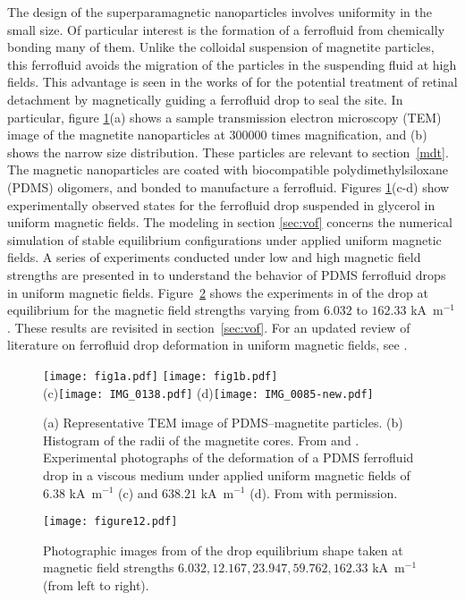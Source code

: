 The design of the superparamagnetic nanoparticles involves uniformity in the small size. Of particular interest is the formation of a ferrofluid from chemically bonding many of them. Unlike the colloidal suspension of magnetite particles, this ferrofluid avoids the  migration of the particles in the suspending fluid at high fields. This advantage is seen in the works of \cite{Mefford,Mefford2008a,Mefford2008b} for the potential treatment of retinal detachment by magnetically guiding a ferrofluid drop to seal the site. In particular, figure \ref{fig:fig1}(a) shows a sample transmission electron microscopy (TEM) 
image of the magnetite nanoparticles at $300000$ times magnification, and (b) shows the narrow size distribution. These particles are relevant to section~\ref{mdt}.  
The magnetic nanoparticles are coated with  biocompatible polydimethylsiloxane (PDMS) oligomers, and bonded to manufacture a ferrofluid. Figures \ref{fig:fig1}(c-d) show  experimentally observed states for the ferrofluid drop suspended in glycerol in uniform magnetic fields.  
The modeling in section \ref{sec:vof} concerns the numerical simulation of stable equilibrium configurations under applied uniform magnetic fields. A series of experiments conducted under low and high magnetic field strengths 
are presented in \cite{ATRRWPR} to understand the behavior of PDMS
ferrofluid drops in uniform magnetic fields. 
Figure~\ref{fig:figure12} shows the experiments in \cite{ATRRWPR} of the drop at equilibrium for
the magnetic field strengths  varying from $6.032$ to $162.33$ kA~m$^{-1}$.
These results are revisited in section~\ref{sec:vof}. For an updated review of literature
on ferrofluid drop deformation in uniform magnetic fields, see \cite{Rowghanian}.
\begin{figure}
\begin{center}
 \texttt{[image: fig1a.pdf]}
  \texttt{[image: fig1b.pdf]}\\
(c)\texttt{[image: IMG\_0138.pdf]}
(d)\texttt{[image: IMG\_0085-new.pdf]}
\end{center}
\caption{(a) Representative TEM image of PDMS--magnetite particles. 
(b) Histogram of the radii of the magnetite cores. From \cite{Mefford} and \cite{Mefford2008a}.
Experimental photographs of the deformation of a PDMS ferrofluid drop
in a viscous medium under applied uniform magnetic fields of $6.38$ kA~m$^{-1}$ (c) 
and $638.21$ kA~m$^{-1}$ (d). From \cite{ARRRP} with permission.} 
\label{fig:fig1}
\end{figure}
\begin{figure}
\begin{center}
\texttt{[image: figure12.pdf]}
\caption{Photographic images from \cite{ARRRP} of the drop equilibrium shape taken at
magnetic field strengths $6.032, 12.167, 23.947, 59.762, 162.33$ kA~m$^{-1}$ (from left to right).} 
\label{fig:figure12}
\end{center}
\end{figure}


